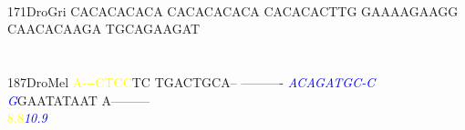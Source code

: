 \documentclass[11pt,twoside,reqno,a4paper]{article}
\begin{document}
{\hspace*{4\charwidth}\hspace*{7\charwidth}\hspace*{1\charwidth}\hspace*{1\charwidth}\hspace*{1\charwidth}\hspace*{1\charwidth}\hspace*{1\charwidth}\hspace*{1\charwidth}\\
171\hspace*{1\charwidth}DroGri	CACACACACA	CACACACACA	CACACACTTG	GAAAAGAAGG	CAACACAAGA	TGCAGAAGAT	\\
\hspace*{4\charwidth}\hspace*{7\charwidth}\hspace*{1\charwidth}\hspace*{1\charwidth}\hspace*{1\charwidth}\hspace*{1\charwidth}\hspace*{1\charwidth}\hspace*{1\charwidth}\\
\\
187\hspace*{1\charwidth}DroMel	\textcolor{yellow}{A}\textcolor{yellow}{-}\textcolor{yellow}{-}\textcolor{yellow}{-}\textcolor{yellow}{C}\textcolor{yellow}{T}\textcolor{yellow}{C}\textcolor{yellow}{C}TC	TGACTGCA--	----------	\textit{\textcolor{blue}{A}}\textit{\textcolor{blue}{C}}\textit{\textcolor{blue}{A}}\textit{\textcolor{blue}{G}}\textit{\textcolor{blue}{A}}\textit{\textcolor{blue}{T}}\textit{\textcolor{blue}{G}}\textit{\textcolor{blue}{C}}\textit{\textcolor{blue}{-}}\textit{\textcolor{blue}{C}}	\textit{\textcolor{blue}{G}}GAATATAAT	A---------	\\
\hspace*{4\charwidth}\hspace*{7\charwidth}\hspace*{0\charwidth}\textcolor{yellow}{8.8}\hspace*{1\charwidth}\hspace*{1\charwidth}\hspace*{1\charwidth}\hspace*{27\charwidth}\textit{\textcolor{blue}{10.9}}\hspace*{1\charwidth}\hspace*{1\charwidth}\hspace*{1\charwidth}\\
}
\end{document}
